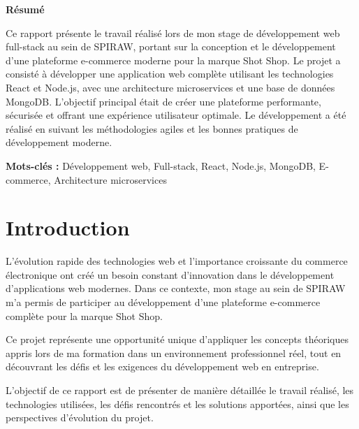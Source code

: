 \documentclass[12pt,a4paper]{article}
\begin{document}
\begin{center}
\vspace*{3cm}

{\Huge\bfseries Résumé\par}

\vspace{2cm}

\begin{minipage}{0.8\textwidth}
Ce rapport présente le travail réalisé lors de mon stage de développement web full-stack au sein de SPIRAW, portant sur la conception et le développement d'une plateforme e-commerce moderne pour la marque Shot Shop. Le projet a consisté à développer une application web complète utilisant les technologies React et Node.js, avec une architecture microservices et une base de données MongoDB. L'objectif principal était de créer une plateforme performante, sécurisée et offrant une expérience utilisateur optimale. Le développement a été réalisé en suivant les méthodologies agiles et les bonnes pratiques de développement moderne.

\vspace{1cm}

\textbf{Mots-clés :} Développement web, Full-stack, React, Node.js, MongoDB, E-commerce, Architecture microservices
\end{minipage}
\end{center}

\newpage

\tableofcontents
\newpage

\section{Introduction}
L'évolution rapide des technologies web et l'importance croissante du commerce électronique ont créé un besoin constant d'innovation dans le développement d'applications web modernes. Dans ce contexte, mon stage au sein de SPIRAW m'a permis de participer au développement d'une plateforme e-commerce complète pour la marque Shot Shop.

Ce projet représente une opportunité unique d'appliquer les concepts théoriques appris lors de ma formation dans un environnement professionnel réel, tout en découvrant les défis et les exigences du développement web en entreprise.

L'objectif de ce rapport est de présenter de manière détaillée le travail réalisé, les technologies utilisées, les défis rencontrés et les solutions apportées, ainsi que les perspectives d'évolution du projet.
\end{document}
